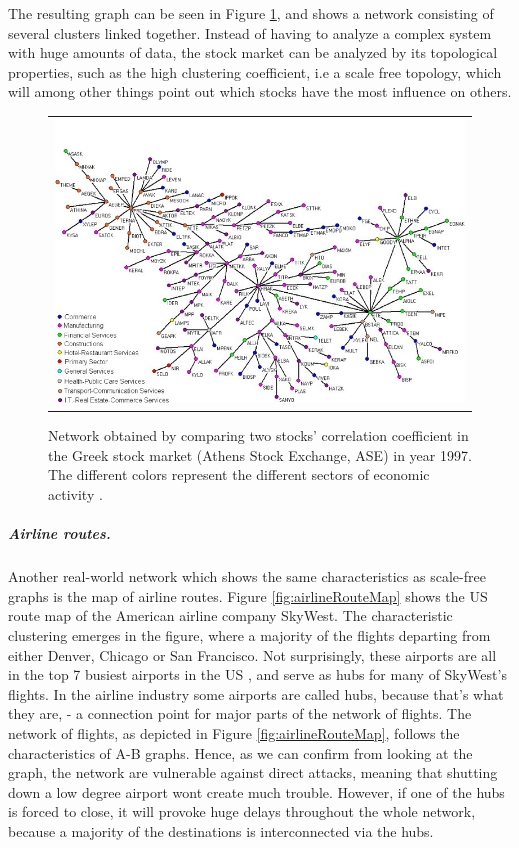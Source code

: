 The resulting graph can be seen in Figure \ref{fig:greekStockMarket}, and shows a network consisting of several clusters linked together. Instead of having to analyze a complex system with huge amounts of data, the stock market can be analyzed by its topological properties, such as the high clustering coefficient, i.e a scale free topology, which will among other things point out which stocks have the most influence on others. 
\begin{figure}[h]
\centering
\begin{tabular}{@{}c@{}}
\includegraphics[width=1.0\textwidth]{../Figures/greekStockMarket.jpg}
\end{tabular}
\caption[Network of two stocks' correlation coefficient at Athens Stock Exchange, ASE.]{Network obtained by comparing two stocks' correlation coefficient in the Greek stock market (Athens Stock Exchange, ASE) in year 1997. The different colors represent the different sectors of economic activity \cite{greekStockMarket}.
\label{fig:greekStockMarket}}
\end{figure}

\subparagraph{Airline routes.}
Another real-world network which shows the same characteristics as scale-free graphs is the map of airline routes. Figure \ref{fig:airlineRouteMap} shows the US route map of the American airline company SkyWest. The characteristic clustering emerges in the figure, where a majority of the flights departing from either Denver, Chicago or San Francisco. Not surprisingly, these airports are all in the top 7 busiest airports in the US \cite{busiestAirports}, and serve as hubs for many of SkyWest's flights. In the airline industry some airports are called hubs, because that's what they are, - a connection point for major parts of the network of flights. The network of flights, as depicted in Figure \ref{fig:airlineRouteMap}, follows the characteristics of A-B graphs. Hence, as we can confirm from looking at the graph, the network are vulnerable against direct attacks, meaning that shutting down a low degree airport wont create much trouble. However, if one of the hubs is forced to close, it will provoke huge delays throughout the whole network, because a majority of the destinations is interconnected via the hubs. 


